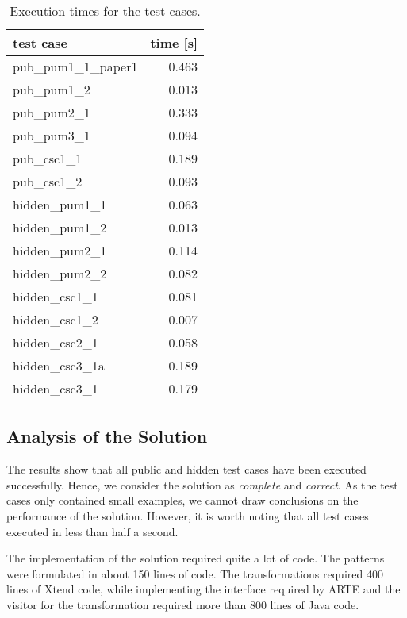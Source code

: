 \documentclass[submission,copyright,creativecommons]{eptcs}
\begin{document}
\begin{table}[!htb]
\centering
\footnotesize
\begin{tabular}{| l | r |}
\hline
\bf test case & \bf time [s]\\\hline\hline
\sf pub\_pum1\_1\_paper1 & 0.463 \\\hline
\sf pub\_pum1\_2 & 0.013 \\\hline
\sf pub\_pum2\_1 & 0.333 \\\hline
\sf pub\_pum3\_1 & 0.094 \\\hline
\sf pub\_csc1\_1 & 0.189 \\\hline
\sf pub\_csc1\_2 & 0.093 \\\hline
\sf hidden\_pum1\_1 & 0.063 \\\hline
\sf hidden\_pum1\_2 & 0.013 \\\hline
\sf hidden\_pum2\_1 & 0.114 \\\hline
\sf hidden\_pum2\_2 & 0.082 \\\hline
\sf hidden\_csc1\_1 & 0.081 \\\hline
\sf hidden\_csc1\_2 & 0.007 \\\hline
\sf hidden\_csc2\_1 & 0.058 \\\hline
\sf hidden\_csc3\_1a & 0.189 \\\hline
\sf hidden\_csc3\_1 & 0.179 \\\hline

\end{tabular}\caption{Execution times for the test cases.}
\label{tab:execution-times}
\end{table}

\subsection{Analysis of the Solution}

The results show that all public and hidden test cases have been executed successfully. Hence, we consider the solution as \emph{complete} and \emph{correct}. As the test cases only contained small examples, we cannot draw conclusions on the performance of the solution. However, it is worth noting that all test cases executed in less than half a second.

The implementation of the solution required quite a lot of code. The patterns were formulated in about 150 lines of \iqpl code. The transformations required 400 lines of Xtend code, while implementing the interface required by ARTE and the visitor for the transformation required more than 800 lines of Java code.
\end{document}
